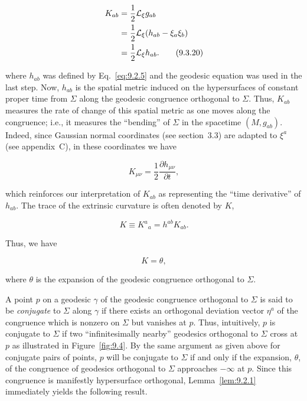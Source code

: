 \begin{align}
  K_{ab}
    &=\frac12\mathcal L_\xi g_{ab}\notag\\
    &=\frac12\mathcal L_\xi(h_{ab}-\xi_a\xi_b)\notag\\
    &=\frac12\mathcal L_\xi h_{ab} .
  \tag{9.3.20}\label{eq:9.3.20}
\end{align}

where \(h_{ab}\) was defined by Eq.~\eqref{eq:9.2.5} and the geodesic equation was
used in the last step. Now, \(h_{ab}\) is the spatial metric induced on the hypersurfaces
of constant proper time from \(\Sigma\) along the geodesic congruence orthogonal to
\(\Sigma\). Thus, \(K_{ab}\) measures the rate of change of this spatial metric as one
moves along the congruence; i.e., it measures the ``bending'' of \(\Sigma\) in the
spacetime \((M,g_{ab})\). Indeed, since Gaussian normal coordinates (see
section~3.3) are adapted to \(\xi^a\) (see appendix~C), in these coordinates we have

\begin{equation}
  K_{\mu\nu}=\frac12\frac{\partial h_{\mu\nu}}{\partial t} ,
  \tag{9.3.21}\label{eq:9.3.21}
\end{equation}

which reinforces our interpretation of \(K_{ab}\) as representing the ``time derivative''
of \(h_{ab}\). The trace of the extrinsic curvature is often denoted by \(K\),

\begin{equation}
  K\equiv K^a{}_a=h^{ab}K_{ab} .
  \tag{9.3.22}\label{eq:9.3.22}
\end{equation}

Thus, we have

\begin{equation}
  K=\theta ,
  \tag{9.3.23}\label{eq:9.3.23}
\end{equation}

where \(\theta\) is the expansion of the geodesic congruence orthogonal to \(\Sigma\).

A point \(p\) on a geodesic \(\gamma\) of the geodesic congruence orthogonal to
\(\Sigma\) is said to be \emph{conjugate} to \(\Sigma\) along \(\gamma\) if there exists an
orthogonal deviation vector \(\eta^a\) of the congruence which is nonzero on
\(\Sigma\) but vanishes at \(p\). Thus, intuitively, \(p\) is conjugate to \(\Sigma\) if two
``infinitesimally nearby'' geodesics orthogonal to \(\Sigma\) cross at \(p\) as illustrated
in Figure~\ref{fig:9.4}. By the same argument as given above for conjugate pairs of
points, \(p\) will be conjugate to \(\Sigma\) if and only if the expansion, \(\theta\), of the
congruence of geodesics orthogonal to \(\Sigma\) approaches \(-\infty\) at \(p\). Since
this congruence is manifestly hypersurface orthogonal, Lemma~\ref{lem:9.2.1}
immediately yields the following result.

